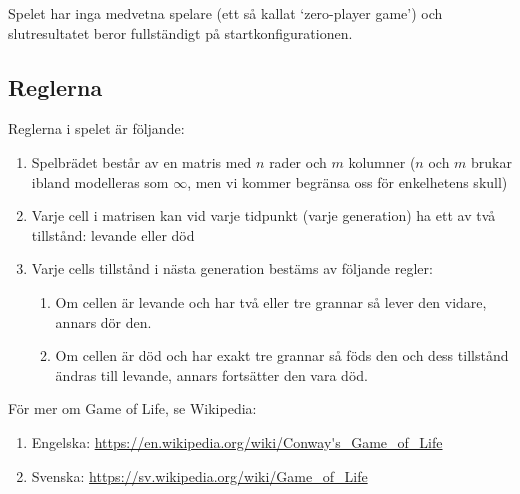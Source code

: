 Spelet har inga medvetna spelare (ett så kallat `zero-player game') och slutresultatet beror fullständigt på startkonfigurationen.





\subsection{Reglerna}

Reglerna i spelet är följande:

\begin{enumerate}
    \item Spelbrädet består av en matris med $n$ rader och $m$ kolumner ($n$ och $m$ brukar ibland modelleras som $\infty$, men vi kommer begränsa oss för enkelhetens skull)
    \item Varje cell i matrisen kan vid varje tidpunkt (varje generation) ha ett av två tillstånd: levande eller död
    \item Varje cells tillstånd i nästa generation bestäms av följande regler:
        \begin{enumerate}
            \item Om cellen är levande och har två eller tre grannar så lever den vidare, annars dör den.
            \item Om cellen är död och har exakt tre grannar så föds den och dess tillstånd ändras till levande, annars fortsätter den vara död.
        \end{enumerate}
\end{enumerate}


För mer om Game of Life, se Wikipedia:

\begin{enumerate}
    \item Engelska: \url{https://en.wikipedia.org/wiki/Conway's_Game_of_Life}
    \item Svenska: \url{https://sv.wikipedia.org/wiki/Game_of_Life}
\end{enumerate}



